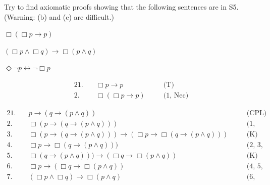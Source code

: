 \begin{exercise}
  Try to find axiomatic proofs showing that the following sentences are in S5.
  (Warning: (b) and (c) are difficult.)
  \begin{exlist}
    \item $\Box(\Box p \to p)$
    \item $(\Box p \land \Box q) \to \Box(p \land q)$
    \item $\Diamond \neg p \leftrightarrow \neg \Box p$
  \end{exlist}
\end{exercise}
\begin{solution}
  \begin{sollist}
    
    \item 
    \begin{alignat*}{2}
      1.\quad& \Box p \to p &\quad& \text{(T)}\\
      2.\quad& \Box(\Box p \to p) &\quad& \text{(1, Nec)}
    \end{alignat*}
    
    \item 
    \begin{alignat*}{2}
      1.\quad& p \to (q \to (p \land q)) &\quad& \text{(CPL)}\\
      2.\quad& \Box (p \to (q \to (p \land q))) &\quad& \text{(1, Nec)}\\
      3.\quad& \Box (p \to (q \to (p \land q))) \to (\Box p \to \Box (q \to (p \land q))) &\quad& \text{(K)}\\
      4.\quad& \Box p \to \Box (q \to (p \land q))) &\quad& \text{(2, 3, CPL)}\\
      5.\quad& \Box (q \to (p \land q))) \to (\Box q \to \Box (p\land q))  &\quad& \text{(K)}\\
      6.\quad& \Box p \to (\Box q \to \Box (p\land q))  &\quad& \text{(4, 5, CPL)}\\
      7.\quad& (\Box p \land \Box q) \to \Box (p\land q)  &\quad& \text{(6, CPL)}
    \end{alignat*}


\end{sollist}
\end{solution}
